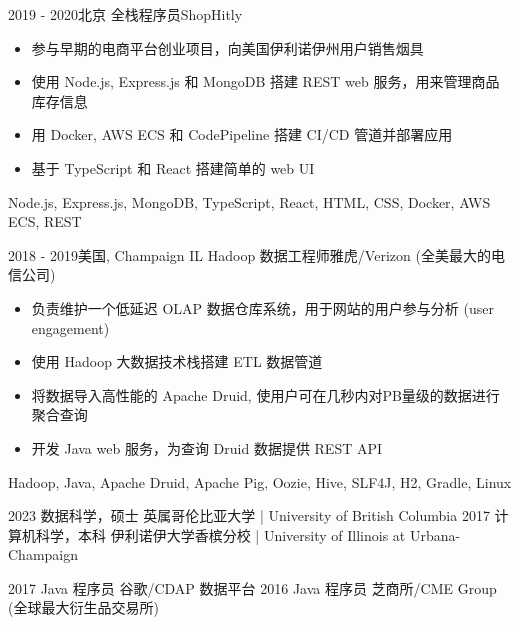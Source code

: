 \documentclass[alternative]{resume_template}
\begin{document}
\begin{experiences}
    \experience
    {2019 - 2020}{北京}
    {全栈程序员}{ShopHitly}
    {
        \begin{itemize}
        \item 参与早期的电商平台创业项目，向美国伊利诺伊州用户销售烟具
        \item 使用 Node.js, Express.js 和 MongoDB 搭建 REST web 服务，用来管理商品库存信息
        \item 用 Docker, AWS ECS 和 CodePipeline 搭建 CI/CD 管道并部署应用
        \item 基于 TypeScript 和 React 搭建简单的 web UI
        \end{itemize}
    }
    {Node.js, Express.js, MongoDB, TypeScript, React, HTML, CSS, Docker, AWS ECS, REST}
    
    \experience
    {2018 - 2019}{美国, Champaign IL}
    {Hadoop 数据工程师}{雅虎/Verizon (全美最大的电信公司)}
    {
        \begin{itemize}
        \item 负责维护一个低延迟 OLAP 数据仓库系统，用于网站的用户参与分析 (user engagement)
        \item 使用 Hadoop 大数据技术栈搭建 ETL 数据管道
        \item 将数据导入高性能的 Apache Druid, 使用户可在几秒内对PB量级的数据进行聚合查询
        \item 开发 Java web 服务，为查询 Druid 数据提供 REST API
        \end{itemize}
    }
    {Hadoop, Java, Apache Druid, Apache Pig, Oozie, Hive, SLF4J, H2, Gradle, Linux}
    
    \end{experiences}

    \begin{experiences}
    \degree
    {2023}
    {数据科学，硕士}
    {英属哥伦比亚大学 | University of British Columbia}
    \vspace{5pt}
	\degree
    {2017}
    {计算机科学，本科}
    {伊利诺伊大学香槟分校 | University of Illinois at Urbana-Champaign}
    \vspace{5pt}
    \end{experiences}

    \begin{internships}
	\internship
    {2017}
    {Java 程序员}
    {谷歌/CDAP 数据平台}
    \vspace{5pt}
	\internship
    {2016}
    {Java 程序员}
    {芝商所/CME Group (全球最大衍生品交易所)}
    \end{internships}
\end{document}

